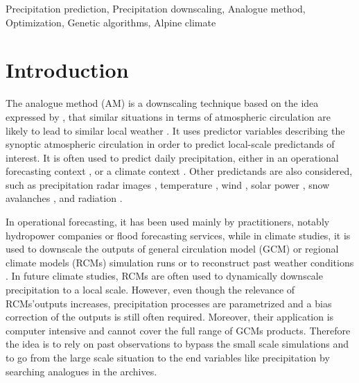 \documentclass[review]{elsarticle}
\begin{document}
\begin{frontmatter}
\begin{keyword}
Precipitation prediction\sep
Precipitation downscaling\sep
Analogue method\sep
Optimization\sep
Genetic algorithms\sep
Alpine climate
\end{keyword}

\end{frontmatter}

\linenumbers

\section{Introduction}
\label{sec:intro}

The analogue method (AM) is a downscaling technique based on the idea expressed by \citet{Lorenz1956, Lorenz1969}, that similar situations in terms of atmospheric circulation are likely to lead to similar local weather \citep{Duband1970}. It uses predictor variables describing the synoptic atmospheric circulation in order to predict local-scale predictands of interest. It is often used to predict daily precipitation, either in an operational forecasting context \citep[e.g.,][]{Guilbaud1997, Bontron2005, Hamill2006, Bliefernicht2010, Marty2012, Horton2012, Hamill2015, BenDaoud2016, Horton2016a}, or a climate context \citep[e.g.,][]{Radanovics2013, Chardon2014, Dayon2015, Raynaud2016b}. Other predictands are also considered, such as precipitation radar images \citep{Panziera2011,Foresti2015a}, temperature \citep{Radinovic1975, Woodcock1980, Kruizinga1983, DelleMonache2013, Caillouet2016, Raynaud2016b}, wind \citep{Gordon1987, DelleMonache2013, DelleMonache2011, Vanvyve2015, Alessandrini2015, Junk2015, Junk2015c}, solar power \citep{Alessandrini2015a, Bessa2015}, snow avalanches \citep{Obled1980, Bolognesi1993}, and radiation \citep{Bois1981, Raynaud2016b}.

In operational forecasting, it has been used mainly by practitioners, notably hydropower companies or flood forecasting services, while in climate studies, it is used to downscale the outputs of general circulation model (GCM) or regional climate models (RCMs) simulation runs \citep{Dayon2015} or to reconstruct past weather conditions \citep{Caillouet2016}. In future climate studies, RCMs are often used to dynamically downscale precipitation to a local scale. However, even though the relevance of RCMs'outputs increases, precipitation processes are parametrized and a bias correction of the outputs is still often required. Moreover, their application is computer intensive and cannot cover the full range of GCMs products. Therefore the idea is to rely on past observations to bypass the small scale simulations and to go from the large scale situation to the end variables like precipitation by searching analogues in the archives. 
\end{document}
